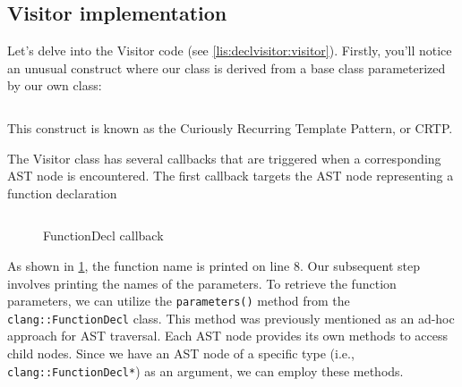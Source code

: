 \subsection{Visitor implementation}
Let's delve into the Visitor code (see \cref{lis:declvisitor:visitor}).
Firstly, you'll notice an unusual construct where our class is derived from a
base class parameterized by our own class: 
\inputminted[firstline=5,lastline=5]{c++}{src/part1/ch3_ast/declvisitor/Visitor.hpp}
This construct is known as the Curiously Recurring Template Pattern, or CRTP.

The Visitor class has several callbacks that are triggered when a corresponding
AST node is encountered. The first callback targets the AST node representing a
function declaration
\begin{figure}[H]
  \inputminted[firstline=7,lastline=12]{c++}{src/part1/ch3_ast/declvisitor/Visitor.hpp}
  \caption{FunctionDecl callback}
  \label{lis:declvisitor:visitor:visitfunctiondecl}
\end{figure}
As shown in \cref{lis:declvisitor:visitor:visitfunctiondecl}, the function name
is printed on line 8. Our subsequent step involves printing the names of the
parameters. To retrieve the function parameters, we can utilize the
\texttt{parameters()} method from the
\texttt{clang::FunctionDecl} class. This method was previously
mentioned as an ad-hoc approach for AST traversal. Each AST node provides its
own methods to access child nodes. Since we have an AST node of a specific type
(i.e., \texttt{clang::FunctionDecl*}) as an argument, we can employ
these methods. 

